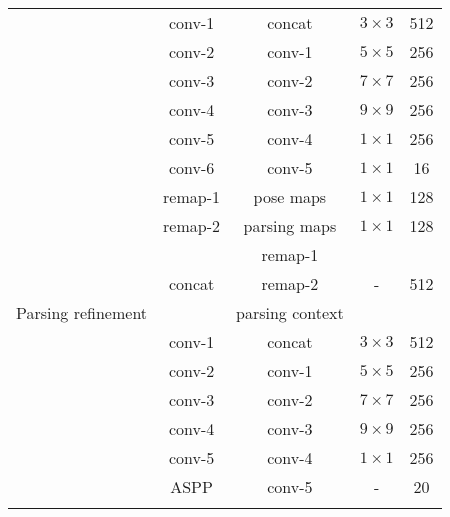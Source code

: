 \documentclass[10pt,journal,compsoc]{IEEEtran}
\begin{document}
\begin{table}[t]
\begin{tabular}{ccccc}
                                       & conv-1    & concat        & $3\times3$       &  512     \\
                                       & conv-2    & conv-1        & $5\times5$       &  256     \\
                                       & conv-3    & conv-2        & $7\times7$       &  256     \\
                                       & conv-4    & conv-3        & $9\times9$       &  256     \\
                                       & conv-5    & conv-4        & $1\times1$       &  256     \\
                                       & conv-6    & conv-5        & $1\times1$       &  16     \\ 
\toprule[0.8pt]
   \multirow{9}{*}{Parsing refinement} & remap-1   & pose maps     & $1\times1$       &  128     \\
                                       & remap-2   & parsing maps  & $1\times1$       &  128     \\
                                       & \multirow{3}{*}{concat}   & remap-1          & \multirow{3}{*}{-}  & \multirow{3}{*}{512}  \\
                                       &                           & remap-2          &                     &                       \\
                                       &                           & parsing context   &                     &                       \\
                                       & conv-1    & concat        & $3\times3$       &  512     \\
                                       & conv-2    & conv-1        & $5\times5$       &  256     \\
                                       & conv-3    & conv-2        & $7\times7$       &  256     \\
                                       & conv-4    & conv-3        & $9\times9$       &  256     \\
                                       & conv-5    & conv-4        & $1\times1$       &  256     \\
                                       & ASPP      & conv-5        & -                &  20     \\ 

\toprule[0.8pt]
\vspace{-6mm}
\end{tabular}
\end{table}
\end{document}
